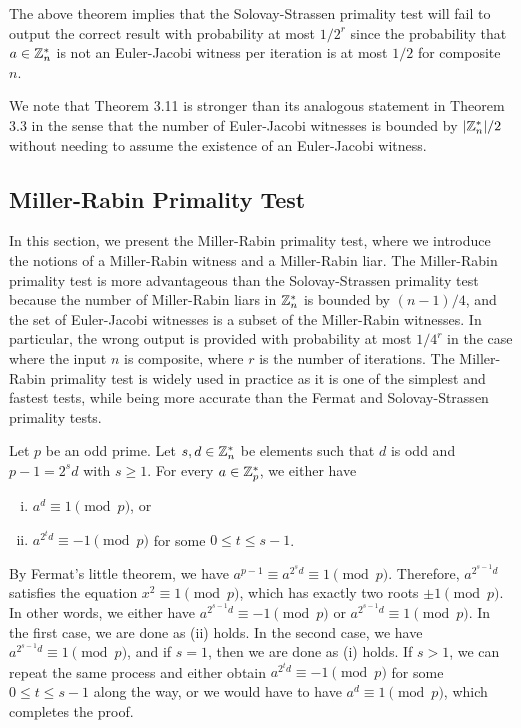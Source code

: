 The above theorem implies that the Solovay-Strassen primality test will fail to output the 
correct result with probability at most $1/2^r$ since the probability that $a \in \mathbb{Z}_n^*$ 
is not an Euler-Jacobi witness per iteration is at most $1/2$ for composite $n$. 

We note that Theorem 3.11 is stronger than its analogous statement in Theorem 3.3 in the sense that
the number of Euler-Jacobi witnesses is bounded by $|\mathbb{Z}_n^*|/2$ without needing to assume the 
existence of an Euler-Jacobi witness. 

\subsection{Miller-Rabin Primality Test}

In this section, we present the Miller-Rabin primality test, where we introduce the notions of a Miller-Rabin witness and a Miller-Rabin liar. The Miller-Rabin primality test is more advantageous than the Solovay-Strassen primality test because the number of Miller-Rabin liars in $\mathbb{Z}_n^*$ is bounded by $(n-1)/4$, and the set of Euler-Jacobi witnesses is a subset of 
the Miller-Rabin witnesses. In particular, the wrong output is provided with probability at most 
$1/4^r$ in the case where the input $n$ is composite, where $r$ is the number of iterations. 
The Miller-Rabin primality test is widely used in practice as it is one of the simplest and 
fastest tests, while being more accurate than the Fermat and Solovay-Strassen primality tests. 

\begin{thm}
Let $p$ be an odd prime. Let $s, d \in \mathbb{Z}_n^*$ be elements such that $d$ is odd and 
$p - 1 = 2^s d$ with $s \geq 1$. For every $a \in \mathbb{Z}_p^*$, we either have 
\begin{enumerate}[(i)]
    \item $a^d \equiv 1 \pmod p$, or 
    \item $a^{2^td} \equiv -1 \pmod p$ for some $0 \leq t \leq s-1$. 
\end{enumerate}
\end{thm}
\begin{pf}
By Fermat's little theorem, we have $a^{p-1} \equiv a^{2^sd} \equiv 1 \pmod p$. Therefore, 
$a^{2^{s-1}d}$ satisfies the equation $x^2 \equiv 1 \pmod p$, which has exactly two roots 
$\pm1 \pmod p$. In other words, we either have $a^{2^{s-1}d} \equiv -1 \pmod p$ or 
$a^{2^{s-1}d} \equiv 1 \pmod p$. In the first case, we are done as (ii) holds. 
In the second case, we have $a^{2^{s-1}d} \equiv 1 \pmod p$, and if $s = 1$, then we are done as 
(i) holds. If $s > 1$, we can repeat the same process and either obtain $a^{2^td} \equiv -1 \pmod p$
for some $0 \leq t \leq s-1$ along the way, or we would have to have $a^d \equiv 1 \pmod p$, 
which completes the proof. 
\end{pf}


